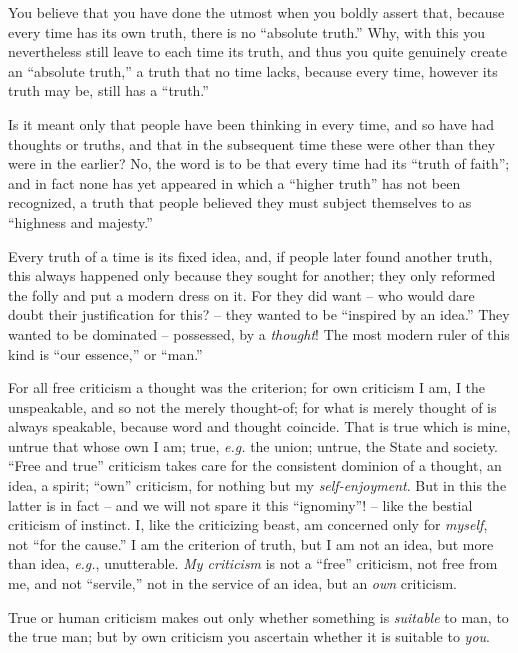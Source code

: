 You believe that you have done the utmost when you boldly assert that, because 
every time has its own truth, there is no ``absolute truth.'' Why, with this 
you nevertheless still leave to each time its truth, and thus you quite 
genuinely create an ``absolute truth,'' a truth that no time lacks, because 
every time, however its truth may be, still has a ``truth.''

Is it meant only that people have been thinking in every time, and so have had 
thoughts or truths, and that in the subsequent time these were other than they 
were in the earlier? No, the word is to be that every time had its ``truth of 
faith''; and in fact none has yet appeared in which a ``higher truth'' has 
not been recognized, a truth that people believed they must subject themselves 
to as ``highness and majesty.''

Every truth of a time is its fixed idea, and, if people later found another 
truth, this always happened only because they sought for another; they only 
reformed the folly and put a modern dress on it. For they did want -- who 
would dare doubt their justification for this? -- they wanted to be 
``inspired by an idea.'' They wanted to be dominated -- possessed, by a 
\textit{thought}! The most modern ruler of this kind is ``our essence,'' or 
``man.''

For all free criticism a thought was the criterion; for own criticism I am, I 
the unspeakable, and so not the merely thought-of; for what is merely thought 
of is always speakable, because word and thought coincide. That is true which 
is mine, untrue that whose own I am; true, \textit{e.g.} the union; untrue, 
the State and society. ``Free and true'' criticism takes care for the 
consistent dominion of a thought, an idea, a spirit; ``own'' criticism, for 
nothing but my \textit{self-enjoyment}. But in this the latter is in fact -- 
and we will not spare it this ``ignominy''! -- like the bestial criticism of 
instinct. I, like the criticizing beast, am concerned only for 
\textit{myself}, not ``for the cause.'' I am the criterion of truth, but I 
am not an idea, but more than idea, \textit{e.g.}, unutterable. \textit{My 
criticism} is not a ``free'' criticism, not free from me, and not 
``servile,'' not in the service of an idea, but an \textit{own} criticism.

True or human criticism makes out only whether something is \textit{suitable} 
to man, to the true man; but by own criticism you ascertain whether it is 
suitable to \textit{you}.

